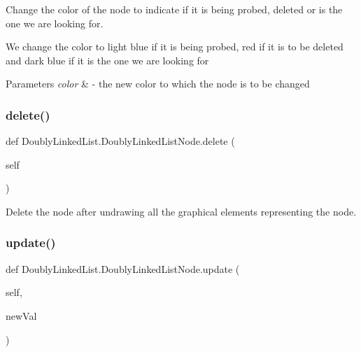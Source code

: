 Change the color of the node to indicate if it is being probed, deleted or is the one we are looking for. 

We change the color to light blue if it is being probed, red if it is to be deleted and dark blue if it is the one we are looking for 
\begin{DoxyParams}{Parameters}
{\em color} & -\/ the new color to which the node is to be changed \\
\hline
\end{DoxyParams}
\mbox{\label{class_doubly_linked_list_1_1_doubly_linked_list_node_ab30dca7fdc595c9497a64c147ae95a99}} 
\subsubsection{\texorpdfstring{delete()}{delete()}}
{\footnotesize\ttfamily def Doubly\+Linked\+List.\+Doubly\+Linked\+List\+Node.\+delete (\begin{DoxyParamCaption}\item[{}]{self }\end{DoxyParamCaption})}



Delete the node after undrawing all the graphical elements representing the node. 

\mbox{\label{class_doubly_linked_list_1_1_doubly_linked_list_node_a241b11fb616624a362ee9c0dcbc42ad2}} 
\subsubsection{\texorpdfstring{update()}{update()}}
{\footnotesize\ttfamily def Doubly\+Linked\+List.\+Doubly\+Linked\+List\+Node.\+update (\begin{DoxyParamCaption}\item[{}]{self,  }\item[{}]{new\+Val }\end{DoxyParamCaption})}



